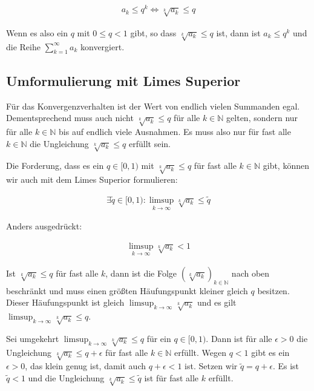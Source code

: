 \documentclass[fontsize=9pt,
               parskip=half-,
               DIV=14,
               listof=chapterentry,
               tocflat]{scrbook}
\begin{document}
\begin{align*}
a_{k}\leq q^{k}\iff {\sqrt[{k}]{a_{k}}}\leq q
\end{align*}

Wenn es also ein $q$ mit $0\leq q<1$ gibt, so dass ${\sqrt[{k}]{a_{k}}}\leq q$ ist, dann ist $a_{k}\leq q^{k}$ und die Reihe $\sum _{k=1}^{\infty }a_{k}$ konvergiert.

\subsection{Umformulierung mit Limes Superior}

Für das Konvergenzverhalten ist der Wert von endlich vielen Summanden egal. Dementsprechend muss auch nicht ${\sqrt[{k}]{a_{k}}}\leq q$ für alle $k\in \mathbb {N} $ gelten, sondern nur für alle $k\in \mathbb {N} $ bis auf endlich viele Ausnahmen. Es muss also nur für fast alle $k\in \mathbb {N} $ die Ungleichung ${\sqrt[{k}]{a_{k}}}\leq q$ erfüllt sein.

Die Forderung, dass es ein $q\in [0,1)$ mit ${\sqrt[{k}]{a_{k}}}\leq q$ für fast alle $k\in \mathbb {N} $ gibt, können wir auch mit dem Limes Superior formulieren:

\begin{align*}
\exists {\tilde {q}}\in [0,1):\limsup _{k\to \infty }{\sqrt[{k}]{a_{k}}}\leq {\tilde {q}}
\end{align*}

Anders ausgedrückt:

\begin{align*}
\limsup _{k\to \infty }{\sqrt[{k}]{a_{k}}}<1
\end{align*}

Ist ${\sqrt[{k}]{a_{k}}}\leq q$ für fast alle $k$, dann ist die Folge $\left({\sqrt[{k}]{a_{k}}}\right)_{k\in \mathbb {N} }$ nach oben beschränkt und muss einen größten Häufungspunkt kleiner gleich $q$ besitzen. Dieser Häufungspunkt ist gleich $\limsup _{k\to \infty }{\sqrt[{k}]{a_{k}}}$ und es gilt $\limsup _{k\to \infty }{\sqrt[{k}]{a_{k}}}\leq q$.

Sei umgekehrt $\limsup _{k\to \infty }{\sqrt[{k}]{a_{k}}}\leq q$ für ein $q\in [0,1)$. Dann ist für alle $\epsilon >0$ die Ungleichung ${\sqrt[{k}]{a_{k}}}\leq q+\epsilon $ für fast alle $k\in \mathbb {N} $ erfüllt. Wegen $q<1$ gibt es ein $\epsilon >0$, das klein genug ist, damit auch $q+\epsilon <1$ ist. Setzen wir ${\tilde {q}}=q+\epsilon $. Es ist ${\tilde {q}}<1$ und die Ungleichung ${\sqrt[{k}]{a_{k}}}\leq {\tilde {q}}$ ist für fast alle $k$ erfüllt.
\end{document}

